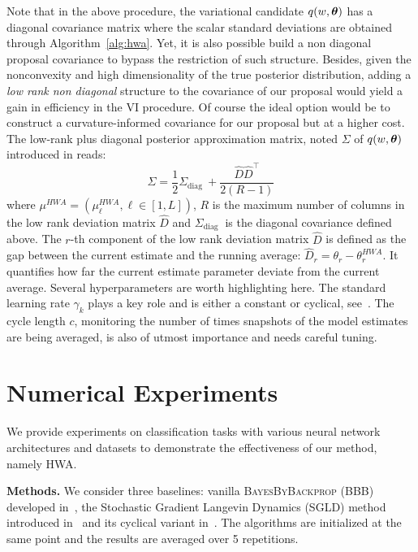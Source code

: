 \documentclass[tablecaption=bottom,wcp]{jmlr}
\begin{document}
Note that in the above procedure, the variational candidate $q(w, \param)$ has a diagonal covariance matrix where the scalar standard deviations are obtained through Algorithm~\ref{alg:hwa}.
Yet, it is also possible build a non diagonal proposal covariance to bypass the restriction of such structure.
Besides, given the nonconvexity and high dimensionality of the true posterior distribution, adding a \emph{low rank non diagonal} structure to the covariance of our proposal would yield a gain in efficiency in the VI procedure.
Of course the ideal option would be to construct a curvature-informed covariance for our proposal but at a higher cost.
The low-rank plus diagonal posterior approximation matrix, noted $\Sigma$ of $q(w, \param)$ introduced in \citep{maddox2019simple} reads:
\begin{equation}\label{eq:lowrankcov}
\Sigma = \frac{1}{2} \Sigma_{\text {diag }}+\frac{\widehat{D} \widehat{D}^{\top}}{2(R-1)}
\end{equation}
where $\mu^{HWA} = (\mu_{\ell}^{HWA}, \ell \in [1,L])$, $R$ is the maximum number of columns in the low rank deviation matrix $\widehat{D}$ and $\Sigma_{\text {diag }}$ is the diagonal covariance defined above. 
The $r$-th component of the  low rank deviation matrix $\widehat{D}$ is defined as the gap between the current estimate and the running average: $\widehat{D}_r = \theta_r - \theta^{HWA}_r$. 
It quantifies how far the current estimate parameter deviate from the current average.
Several hyperparameters are worth highlighting here.
The standard learning rate $\gamma_k$ plays a key role and is either a constant or cyclical, see~\citep{zhang2019cyclical}.
The cycle length $c$, monitoring the number of times snapshots of the model estimates are being averaged, is also of utmost importance and needs careful tuning.


\section{Numerical Experiments}\label{sec:numerical}
We provide experiments on classification tasks with various neural network architectures and datasets to demonstrate the effectiveness of our method, namely HWA.

\vspace{0.08in}
\noindent \textbf{Methods.}\hspace{0.1in}
We consider three baselines: vanilla \textsc{BayesByBackprop} (BBB) developed in~\citep{blundell2015weight}, the Stochastic Gradient Langevin Dynamics (SGLD) method introduced in~\citep{welling2011bayesian} and its cyclical variant in~\citep{zhang2019cyclical}.
The algorithms are initialized at the same point and the results are averaged over 5 repetitions.
\end{document}
